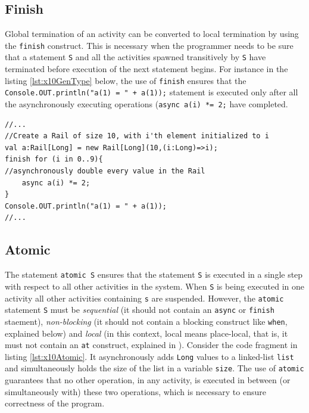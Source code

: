 \subsection{Finish} Global termination of an activity can be converted to local
termination by using the \texttt{finish} construct. This is necessary when the
programmer needs to be sure that a statement \texttt{S} and all the activities
spawned transitively by \texttt{S} have terminated before execution of the next
statement begins. For instance in the listing \ref{lst:x10GenType} below, the use of
\texttt{finish} ensures that the \texttt{Console.OUT.println("a(1) = " + a(1));}
statement is executed only after all the asynchronously executing operations
(\texttt{async a(i) *= 2;} have completed.

\begin{lstlisting}[caption={Example use of \texttt{finish} construct},label={lst:x10GenType},language=x10,numbers=none]
//...
//Create a Rail of size 10, with i'th element initialized to i 
val a:Rail[Long] = new Rail[Long](10,(i:Long)=>i);
finish for (i in 0..9){
//asynchronously double every value in the Rail
	async a(i) *= 2;
}
Console.OUT.println("a(1) = " + a(1));
//...
\end{lstlisting}

\subsection{Atomic} The statement \texttt{atomic S} ensures that the statement
\texttt{S} is executed in a single step with respect to all other activities
in the system.  When \texttt{S} is being executed in one activity all other
activities containing \texttt{s} are suspended. However, the \texttt{atomic}
statement \texttt{S} must be \emph{sequential} (it should not contain an
\texttt{async} or \texttt{finish} staement), \emph{non-blocking} (it should
not contain a blocking construct like \texttt{when}, explained below) and
\emph{local} (in this context, local means place-local, that is, it must not
contain an \texttt{at} construct, explained in ).  Consider
the code fragment in listing \ref{lst:x10Atomic}. It asynchronously adds
\texttt{Long} values to a linked-list \texttt{list} and simultaneously holds
the size of the list in a variable \texttt{size}. The use of \texttt{atomic}
guarantees that no other operation, in any activity, is executed in between
(or simultaneously with) these two operations, which is necessary to ensure
correctness of the
program.

